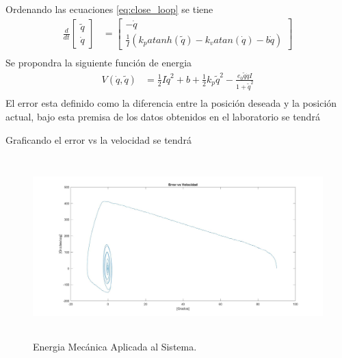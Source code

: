 \documentclass[12pt]{article}
\begin{document}
\begin{enumerate}
\begin{enumerate}
\begin{equation}
        \end{equation}
        Ordenando las ecuaciones \ref{eq:close_loop} se tiene
        \begin{equation}
            \begin{split}
                \frac{d}{dt}
                \begin{bmatrix}
                    \tilde{q} \\
                    \dot{q}
                \end{bmatrix}&=
                \begin{bmatrix}
                    -\dot{q}\\
                    \frac{1}{I}(k_p atanh(\tilde{q})-k_v atan(\dot{q})-b\dot{q})
                \end{bmatrix}\\
            \end{split}
            \label{eq:din_model}
        \end{equation}
        Se propondra la siguiente función de energia
        \begin{equation}
            \begin{split}
                V(\dot{q},\tilde{q})&=\frac{1}{2}I\dot{q}^2+b+\frac{1}{2}k_p\tilde{q}^2-\frac{e_0\tilde{q}\dot{q}I}{1+\tilde{q}^2}\\
            \end{split}
            \label{eq:energia}
        \end{equation}
        El error esta definido como la diferencia entre la posición deseada y la posición actual, bajo esta premisa de los datos obtenidos en el laboratorio se tendrá 
        

        Graficando el error vs la velocidad se tendrá

        \begin{figure}[h]
            \centering
            \includegraphics[width=15cm, height=7cm]{IMAGENES/5.jpg}
            \caption{Energia Mecánica Aplicada al Sistema.}
            \label{fig:energia}
        \end{figure}


\end{enumerate}
\end{enumerate}
\end{document}
